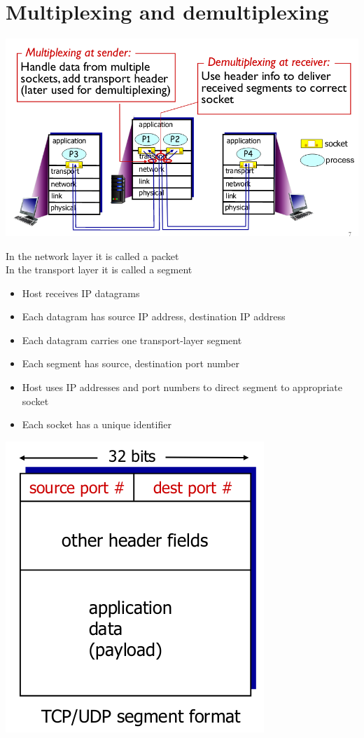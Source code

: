 \documentclass{article}[18pt]
\begin{document}
\section{Multiplexing and demultiplexing}
\begin{center}
	\includegraphics[scale=0.7]{multiplexing}
\end{center}
\begin{important}
In the network layer it is called a packet\\
In the transport layer it is called a segment
\end{important}
\begin{itemize}
	\item Host receives IP datagrams
	\item Each datagram has source IP address, destination IP address
	\item Each datagram carries one transport-layer segment
	\item Each segment has source, destination port number
	\item Host uses IP addresses and port numbers to direct segment to appropriate socket
	\item Each socket has a unique identifier
\end{itemize}
\begin{center}
	\includegraphics[scale=0.7]{segment}
\end{center}
\end{document}

